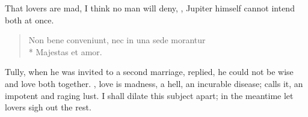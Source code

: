 That lovers are mad, I think no man will deny, , Jupiter himself cannot intend both at
once.
%
\begin{verse}
\textlatin{Non bene conveniunt, nec in una sede morantur}\\*
\textlatin{Majestas et amor.}
\end{verse}

Tully, when he was invited to a second marriage, replied, he could not
 be wise and love both together. , love is madness, a
hell, an incurable disease;  \Seneca
calls it, an impotent and raging lust. I shall dilate this subject
apart; in the meantime let lovers sigh out the rest.

